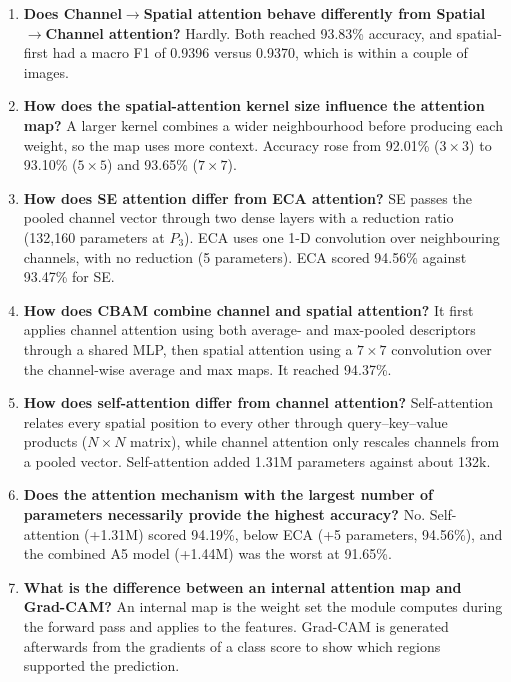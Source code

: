 \documentclass[10pt]{article}
\begin{document}
\begin{enumerate}
\item \textbf{Does Channel$\rightarrow$Spatial attention behave differently from Spatial$\rightarrow$Channel attention?}
Hardly. Both reached 93.83\% accuracy, and spatial-first had a macro F1 of
0.9396 versus 0.9370, which is within a couple of images.

\item \textbf{How does the spatial-attention kernel size influence the attention map?}
A larger kernel combines a wider neighbourhood before producing each weight,
so the map uses more context. Accuracy rose from 92.01\% ($3\times3$) to
93.10\% ($5\times5$) and 93.65\% ($7\times7$).

\item \textbf{How does SE attention differ from ECA attention?}
SE passes the pooled channel vector through two dense layers with a
reduction ratio (132{,}160 parameters at $P_3$). ECA uses one 1-D convolution
over neighbouring channels, with no reduction (5 parameters). ECA scored
94.56\% against 93.47\% for SE.

\item \textbf{How does CBAM combine channel and spatial attention?}
It first applies channel attention using both average- and max-pooled
descriptors through a shared MLP, then spatial attention using a $7\times7$
convolution over the channel-wise average and max maps. It reached 94.37\%.

\item \textbf{How does self-attention differ from channel attention?}
Self-attention relates every spatial position to every other through
query--key--value products ($N\times N$ matrix), while channel attention only
rescales channels from a pooled vector. Self-attention added 1.31M
parameters against about 132k.

\item \textbf{Does the attention mechanism with the largest number of parameters necessarily provide the highest accuracy?}
No. Self-attention (+1.31M) scored 94.19\%, below ECA (+5 parameters,
94.56\%), and the combined A5 model (+1.44M) was the worst at 91.65\%.

\item \textbf{What is the difference between an internal attention map and Grad-CAM?}
An internal map is the weight set the module computes during the forward
pass and applies to the features. Grad-CAM is generated afterwards from the
gradients of a class score to show which regions supported the prediction.


\end{enumerate}
\end{document}
